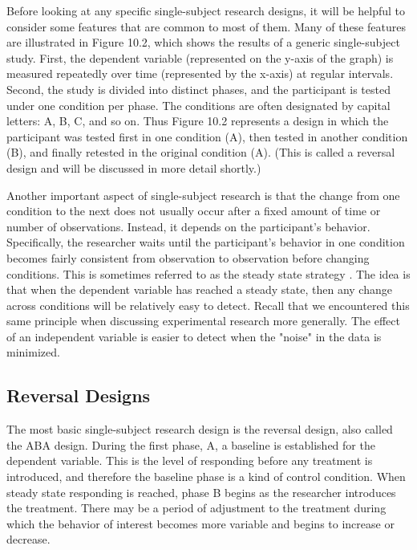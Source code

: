 Before looking at any specific single-subject research designs, it will be helpful to consider some features that are common to most of them. Many of these features are illustrated in Figure 10.2, which shows the results of a generic single-subject study. First, the dependent variable (represented on the y-axis of the graph) is measured repeatedly over time (represented by the x-axis) at regular intervals. Second, the study is divided into distinct phases, and the participant is tested under one condition per phase. The conditions are often designated by capital letters: A, B, C, and so on. Thus Figure 10.2 represents a design in which the participant was tested first in one condition (A), then tested in another condition (B), and finally retested in the original condition (A). (This is called a reversal design and will be discussed in more detail shortly.)

Another important aspect of single-subject research is that the change from one condition to the next does not usually occur after a fixed amount of time or number of observations. Instead, it depends on the participant's behavior. Specifically, the researcher waits until the participant's behavior in one condition becomes fairly consistent from observation to observation before changing conditions. This is sometimes referred to as the steady state strategy \citep{sidman_tactics_1960}. The idea is that when the dependent variable has reached a steady state, then any change across conditions will be relatively easy to detect. Recall that we encountered this same principle when discussing experimental research more generally. The effect of an independent variable is easier to detect when the "noise" in the data is minimized.

\subsection{Reversal Designs}

The most basic single-subject research design is the reversal design, also called the ABA design. During the first phase, A, a baseline is established for the dependent variable. This is the level of responding before any treatment is introduced, and therefore the baseline phase is a kind of control condition. When steady state responding is reached, phase B begins as the researcher introduces the treatment. There may be a period of adjustment to the treatment during which the behavior of interest becomes more variable and begins to increase or decrease. 



